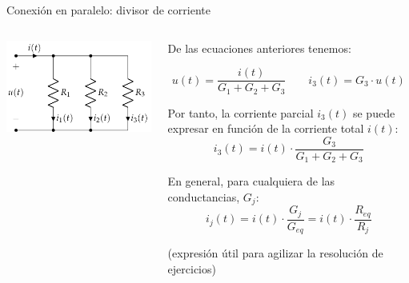 \documentclass[aspectratio=169, xcolor={usenames,svgnames,dvipsnames}]{beamer}
\begin{document}

\begin{frame}{Conexión en paralelo: \hspace{2mm} divisor de corriente}
    \begin{columns}
    \begin{column}{0.4\columnwidth}
        \vspace{-10mm}
        \begin{center}
        \includegraphics[width=1\linewidth]{../figs/AsociacionParalelo.pdf}
        \end{center}
    \end{column}
    \begin{column}{0.6\columnwidth}
    
        \vspace{2mm}
        De las ecuaciones anteriores tenemos:
        
        \begin{equation*}
          u(t) = \frac{i(t)}{G_1 + G_2 + G_3} \qquad
          i_3(t) = G_3 \cdot u(t)
        \end{equation*}
        
        Por tanto, la \alert{corriente parcial} \(i_3(t)\) se puede expresar en función de la corriente total \(i(t)\): 
        \begin{equation*}
          i_3(t) = i(t) \cdot \frac{G_3}{G_1 + G_2 + G_3}  
        \end{equation*}
        
        \alert{En general}, para cualquiera de las conductancias, $G_j$:
        \begin{equation*}
          \boxed{i_j(t) = i(t) \cdot \frac{G_j}{G_{eq}} = i(t) \cdot \frac{R_{eq}}{R_j}}
        \end{equation*}

        \vspace{-1mm}
        \centering \small{(expresión útil para agilizar la resolución de ejercicios)}
    \end{column}
    \end{columns}    
\end{frame}
\end{document}
